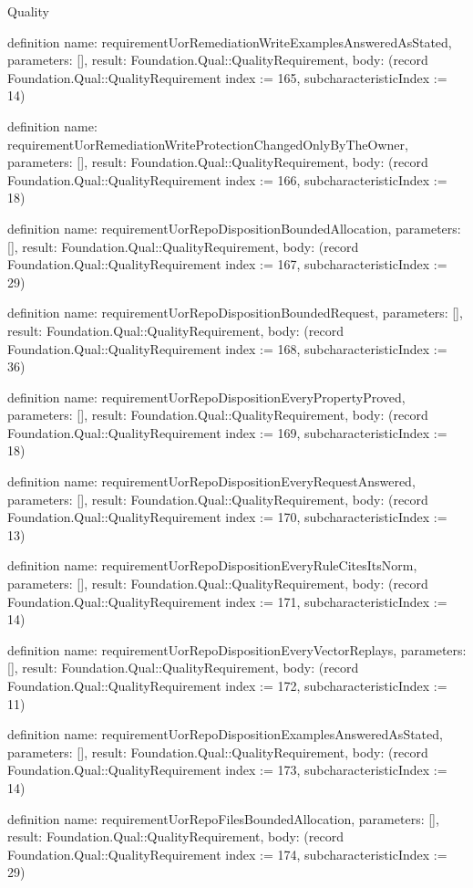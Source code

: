 \begin{lexlean}{Quality}
\begin{semanticmodule}
definition{
  name: requirementUorRemediationWriteExamplesAnsweredAsStated,
  parameters: [],
  result: Foundation.Qual::QualityRequirement,
  body: (record Foundation.Qual::QualityRequirement {index := 165, subcharacteristicIndex := 14})
}

definition{
  name: requirementUorRemediationWriteProtectionChangedOnlyByTheOwner,
  parameters: [],
  result: Foundation.Qual::QualityRequirement,
  body: (record Foundation.Qual::QualityRequirement {index := 166, subcharacteristicIndex := 18})
}

definition{
  name: requirementUorRepoDispositionBoundedAllocation,
  parameters: [],
  result: Foundation.Qual::QualityRequirement,
  body: (record Foundation.Qual::QualityRequirement {index := 167, subcharacteristicIndex := 29})
}

definition{
  name: requirementUorRepoDispositionBoundedRequest,
  parameters: [],
  result: Foundation.Qual::QualityRequirement,
  body: (record Foundation.Qual::QualityRequirement {index := 168, subcharacteristicIndex := 36})
}

definition{
  name: requirementUorRepoDispositionEveryPropertyProved,
  parameters: [],
  result: Foundation.Qual::QualityRequirement,
  body: (record Foundation.Qual::QualityRequirement {index := 169, subcharacteristicIndex := 18})
}

definition{
  name: requirementUorRepoDispositionEveryRequestAnswered,
  parameters: [],
  result: Foundation.Qual::QualityRequirement,
  body: (record Foundation.Qual::QualityRequirement {index := 170, subcharacteristicIndex := 13})
}

definition{
  name: requirementUorRepoDispositionEveryRuleCitesItsNorm,
  parameters: [],
  result: Foundation.Qual::QualityRequirement,
  body: (record Foundation.Qual::QualityRequirement {index := 171, subcharacteristicIndex := 14})
}

definition{
  name: requirementUorRepoDispositionEveryVectorReplays,
  parameters: [],
  result: Foundation.Qual::QualityRequirement,
  body: (record Foundation.Qual::QualityRequirement {index := 172, subcharacteristicIndex := 11})
}

definition{
  name: requirementUorRepoDispositionExamplesAnsweredAsStated,
  parameters: [],
  result: Foundation.Qual::QualityRequirement,
  body: (record Foundation.Qual::QualityRequirement {index := 173, subcharacteristicIndex := 14})
}

definition{
  name: requirementUorRepoFilesBoundedAllocation,
  parameters: [],
  result: Foundation.Qual::QualityRequirement,
  body: (record Foundation.Qual::QualityRequirement {index := 174, subcharacteristicIndex := 29})
}


\end{semanticmodule}
\end{lexlean}
